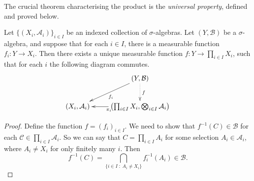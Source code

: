 \documentclass{owmaths}
\begin{document}
The crucial theorem characterising the product is the \emph{universal property}, defined
and proved below.
\begin{proposition}
    Let $\{(X_i,\mathcal{A}_i)\}_{i \in I}$ be an indexed collection of $\sigma$-algebras.
    Let $(Y,\mathcal{B})$ be a $\sigma$-algebra, and suppose that for each $i \in I$, 
    there is a measurable function $f_i:Y\rightarrow X_i$. Then there exists a unique
    measurable function $f:Y\rightarrow \prod_{i \in I} X_i$, such that for each $i$
     the following diagram commutes.
    \begin{displaymath}
        \xymatrix{
           &
           (Y,\mathcal{B}) \ar@{.>}[d]^f \ar[ld]^{f_i}& \\
           (X_i,\mathcal{A}_i) & 
           \left(\prod_{i\in I} X_i,\bigotimes_{i \in I} \mathcal{A}_i\right)\ar[l]^{\pi_i}&     
        }
    \end{displaymath}
\end{proposition}
\begin{proof}
    Define the function $f = (f_i)_{i \in I}$. We need to show that $f^{-1}(C) \in \mathcal{B}$
    for each $\mathcal{C} \in \prod_{i \in I} \mathcal{A}_i$. So we can say that $C = \prod_{i \in I} A_i$
    for some selection $A_i \in \mathcal{A}_i$, where $A_i \neq X_i$ for only finitely
    many $i$. Then 
    \begin{equation*}
        f^{-1}(C) = \bigcap_{\{i \in I\;:\;A_i \neq X_i\}}f_{i}^{-1}(A_i) \in \mathcal{B}.
    \end{equation*}
\end{proof}
\end{document}
